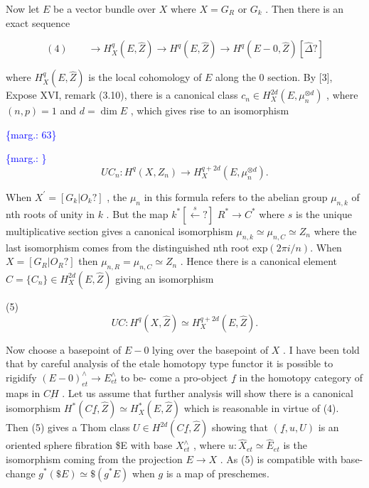 \documentclass[11pt]{article}
\newcommand{\scanpage}[1]{\par\bigskip\noindent{\small\sffamily[scan #1]}\par}
\newcommand{\mspage}[1]{{\small\sffamily[p.\,#1]}}
\newcommand{\margin}[1]{\textcolor{blue}{\{\textsf{marg.:} #1\}}}
\newcommand{\unsure}[1]{[#1?]}
\begin{document}
Now let $E$ be a vector bundle over $X$ where $X = G_R$ or $G_k$ .
Then there is an exact sequence

\[ (4) \qquad \to H^q_X(E,\hat{Z}) \to H^q(E,\hat{Z}) \to H^q(E - 0,\hat{Z}) \unsure{\hat{\Delta}} \]

where $H^q_X(E,\hat{Z})$ is the local cohomology of $E$ along the 0 section.
By [3], Expose XVI, remark (3.10), there is a canonical class
$c_n \in H^{2d}_X(E,\mu_n^{\otimes d})$ , where $(n,p) = 1$ and $d = \dim E$ , which gives
rise to an isomorphism

\margin{63}

\clearpage
\scanpage{162-5/64}
\mspage{- 8 -}

\margin{\checkmark}\[ UC_n : H^q(X, Z_n) \to H^{q+2d}_X (E, \mu_n^{\otimes d}) . \]

When $X^\prime = \unsure{G_k|O_k}$ , the $\mu_n$ in this formula refers to the abelian
group $\mu_{n,k}$ of nth roots of unity in $k$ . But the map $k^* \unsure{\overset{s}{\leftarrow}}$
$R^* \to C^*$ where $s$ is the unique multiplicative section gives a
canonical isomorphism $\mu_{n,k} \simeq \mu_{n,C} \simeq Z_n$ where the last isomorphism
comes from the distinguished nth root exp$(2\pi i/n)$. When $X = \unsure{G_R|O_R}$
then $\mu_{n,R} = \mu_{n,C} \simeq Z_n$ . Hence there is a canonical element
$C = \{C_n\} \in H^{2d}_X(E, \hat{Z})$ giving an isomorphism

(5) \[ UC : H^q(X, \hat{Z}) \simeq H^{q+2d}_X(E, \hat{Z}) . \]

Now choose a basepoint of $E - 0$ lying over the basepoint of $X$ .
I have been told that by careful analysis of the etale homotopy
type functor it is possible to rigidify $(E - 0)^\wedge_{et} \to E^\wedge_{et}$ to be-%
come a pro-object $\underline{f}$ in the homotopy category of maps in $\underline{CH}$ .
Let us assume that further analysis will show there is a canonical
isomorphism $H^*(C\underline{f}, \hat{Z}) \simeq H^*_X(E, \hat{Z})$ which is reasonable in virtue of
(4). Then (5) gives a Thom class $U \in H^{2d}(C\underline{f}, \hat{Z})$ showing that
$(\underline{f},u,U)$ is an oriented sphere fibration \$E with base $X^\wedge_{et}$ ,
where $u : \hat{X}_{et} \simeq \hat{E}_{et}$ is the isomorphism coming from the projection
$E \to X$ . As (5) is compatible with base-change $g^*(\$E) \simeq \$(g^*E)$
when $g$ is a map of preschemes.
\end{document}
